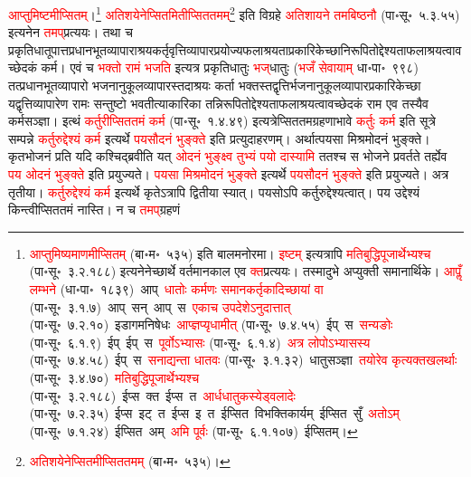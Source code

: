 \begin{sloppypar}
\textcolor{red}{आप्तुमिष्टमीप्सितम्‌}।\footnote{\textcolor{red}{आप्तुमिष्यमाणमीप्सितम्} (बा॰म॰~५३५) इति बाल\-मनोरमा। \textcolor{red}{इष्टम्} इत्यत्रापि \textcolor{red}{मतिबुद्धि\-पूजार्थेभ्यश्च} (पा॰सू॰~३.२.१८८) इत्यनेनेच्छार्थे वर्तमान\-काल एव \textcolor{red}{क्त}\-प्रत्ययः। तस्मादुभे अप्युक्ती समानार्थिके। \textcolor{red}{आपॢँ लम्भने} (धा॰पा॰~१८३९)~\arrow आप्‌~\arrow \textcolor{red}{धातोः कर्मणः समानकर्तृकादिच्छायां वा} (पा॰सू॰~३.१.७)~\arrow आप्~सन्~\arrow आप्~स~\arrow \textcolor{red}{एकाच उपदेशेऽनुदात्तात्‌} (पा॰सू॰~७.२.१०)~\arrow इडागम\-निषेधः~\arrow \textcolor{red}{आप्ज्ञप्यृधामीत्‌} (पा॰सू॰~७.४.५५)~\arrow ईप्~स~\arrow \textcolor{red}{सन्यङोः} (पा॰सू॰~६.१.९)~\arrow ईप्~ईप्~स~\arrow \textcolor{red}{पूर्वोऽभ्यासः} (पा॰सू॰~६.१.४)~\arrow \textcolor{red}{अत्र लोपोऽभ्यासस्य} (पा॰सू॰~७.४.५८)~\arrow ईप्~स~\arrow \textcolor{red}{सनाद्यन्ता धातवः} (पा॰सू॰~३.१.३२)~\arrow धातु\-सञ्ज्ञा~\arrow \textcolor{red}{तयोरेव कृत्य\-क्तखलर्थाः} (पा॰सू॰~३.४.७०)~\arrow \textcolor{red}{मतिबुद्धि\-पूजार्थेभ्यश्च} (पा॰सू॰~३.२.१८८)~\arrow ईप्स~क्त~\arrow ईप्स~त~\arrow \textcolor{red}{आर्धधातुकस्येड्वलादेः} (पा॰सू॰~७.२.३५)~\arrow ईप्स~इट्~त~\arrow ईप्स~इ~त~\arrow ईप्सित~\arrow विभक्ति\-कार्यम्~\arrow ईप्सित~सुँ~\arrow \textcolor{red}{अतोऽम्} (पा॰सू॰~७.१.२४)~\arrow ईप्सित~अम्~\arrow \textcolor{red}{अमि पूर्वः} (पा॰सू॰~६.१.१०७)~\arrow ईप्सितम्।} \textcolor{red}{अतिशयेनेप्सितमितीप्सित\-तमम्‌}\footnote{\textcolor{red}{अतिशयेनेप्सितमीप्सित\-तमम्‌} (बा॰म॰~५३५)।} इति विग्रहे \textcolor{red}{अतिशायने तमबिष्ठनौ} (पा॰सू॰~५.३.५५) इत्यनेन \textcolor{red}{तमप्‌}\-प्रत्ययः। तथा च प्रकृति\-धातूपात्त\-प्रधान\-भूत\-व्यापाराश्रय\-कर्तृ\-वृत्ति\-व्यापार\-प्रयोज्य\-फलाश्रयता\-प्रकारिकेच्छा\-निरूपितोद्देश्यता\-फलाश्रयत्वावच्छेदकं कर्म। एवं च \textcolor{red}{भक्तो रामं भजति} इत्यत्र प्रकृति\-धातुः \textcolor{red}{भज्‌}\-धातुः (\textcolor{red}{भजँ सेवायाम्‌} धा॰पा॰~९९८) तत्प्रधान\-भूत\-व्यापारो भजनानुकूल\-व्यापारस्तदाश्रयः कर्ता भक्तस्तद्वृत्तिर्भजनानुकूल\-व्यापार\-प्रकारिकेच्छा यद्वृत्ति\-व्यापारेण रामः सन्तुष्टो भवतीत्याकारिका तन्निरूपितोद्देश्यता\-फलाश्रयत्वावच्छेदकं राम एव तस्यैव कर्म\-सञ्ज्ञा।
इत्थं \textcolor{red}{कर्तुरीप्सिततमं कर्म} (पा॰सू॰~१.४.४९) इत्यत्रेप्सिततम\-ग्रहणाभावे \textcolor{red}{कर्तुः कर्म} इति सूत्रे सम्पन्ने \textcolor{red}{कर्तुरुद्देश्यं कर्म} इत्यर्थे \textcolor{red}{पयसौदनं भुङ्क्ते} इति प्रत्युदाहरणम्। अर्थात्पयसा मिश्रमोदनं भुङ्क्ते। कृत\-भोजनं प्रति यदि कश्चिद्ब्रवीति यत् \textcolor{red}{ओदनं भुङ्क्ष्व तुभ्यं पयो दास्यामि} ततश्च स भोजने प्रवर्तते तर्ह्येव \textcolor{red}{पय ओदनं भुङ्क्ते} इति प्रयुज्यते। \textcolor{red}{पयसा मिश्रमोदनं भुङ्क्ते} इत्यर्थे \textcolor{red}{पयसौदनं भुङ्क्ते} इति प्रयुज्यते। अत्र तृतीया। \textcolor{red}{कर्तुरुद्देश्यं कर्म} इत्यर्थे कृतेऽत्रापि द्वितीया स्यात्। पयसोऽपि कर्तुरुद्देश्यत्वात्। पय उद्देश्यं किन्त्वीप्सिततमं नास्ति। न च \textcolor{red}{तमप्‌}\-ग्रहणं 

\end{sloppypar}
